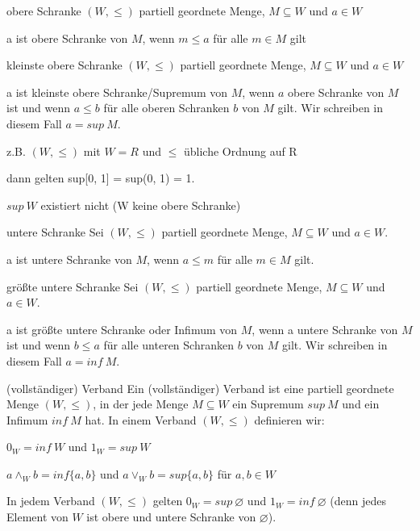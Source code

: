 \documentclass[avery5371]{flashcards}
\begin{document}
\begin{flashcard}[ Wahrheitswertebereiche ]{ obere Schranke }
    $(W,\leq)$ partiell geordnete Menge, $M\subseteq W$ und $a\in W$

    a ist obere Schranke von $M$, wenn $m\leq a$ für alle $m\in M$ gilt
\end{flashcard}

\begin{flashcard}[ Wahrheitswertebereiche ]{ kleinste obere Schranke  }
    $(W,\leq)$ partiell geordnete Menge, $M\subseteq W$ und $a\in W$

    a ist kleinste obere Schranke/Supremum von $M$, wenn $a$ obere Schranke von $M$ ist und wenn $a\leq b$ für alle oberen Schranken $b$ von $M$ gilt. Wir schreiben in diesem Fall $a=sup\ M$.

    z.B. $(W,\leq)$ mit $W=R$ und $\leq$ übliche Ordnung auf R
    \begin{itemize*}
        \item dann gelten sup[0, 1] = sup(0, 1) = 1.
        \item $sup\ W$ existiert nicht (W keine obere Schranke)
    \end{itemize*}
\end{flashcard}

\begin{flashcard}[ Wahrheitswertebereiche ]{ untere Schranke }
    Sei $(W,\leq)$ partiell geordnete Menge, $M\subseteq W$ und $a\in W$.

    a ist untere Schranke von $M$, wenn $a\leq m$ für alle $m\in M$ gilt.
\end{flashcard}

\begin{flashcard}[ Wahrheitswertebereiche ]{ größte untere Schranke }
    Sei $(W,\leq)$ partiell geordnete Menge, $M\subseteq W$ und $a\in W$.

    a ist größte untere Schranke oder Infimum von $M$, wenn a untere Schranke von $M$ ist und wenn $b\leq a$ für alle unteren Schranken $b$ von $M$ gilt. Wir schreiben in diesem Fall $a=inf\ M$.
\end{flashcard}

\begin{flashcard}[ Wahrheitswertebereiche ]{ (vollständiger) Verband }
    Ein (vollständiger) Verband ist eine partiell geordnete Menge $(W,\leq)$, in der jede Menge $M\subseteq W$ ein Supremum $sup\ M$ und ein Infimum $inf\ M$ hat. In einem Verband $(W,\leq)$ definieren wir:
    \begin{itemize*}
        \item $0_W = inf\ W$ und $1_W= sup\ W$
        \item $a\wedge_W b= inf\{a,b\}$ und $a\vee_W b= sup\{a,b\}$ für $a,b\in W$
    \end{itemize*}
    In jedem Verband $(W,\leq)$ gelten $0_W= sup\ \varnothing$ und $1_W= inf\ \varnothing$ (denn jedes Element von $W$ ist obere und untere Schranke von $\varnothing$).
\end{flashcard}
\end{document}
